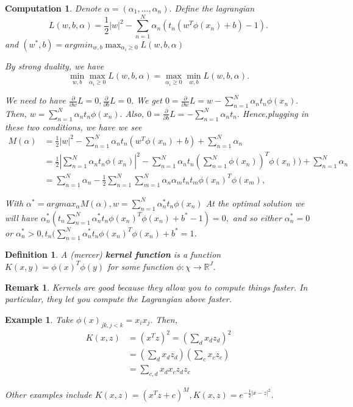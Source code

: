 \documentclass{amsart}
\newtheorem{comp}[subsubsection]{Computation}
\newtheorem{defn}[subsubsection]{Definition}
\newtheorem{rem}[subsubsection]{Remark}
\newtheorem{eg}[subsection]{Example}
\begin{document}
\begin{comp}
Denote $\alpha = (\alpha_1, \ldots, \alpha_n).$ Define the lagrangian 
$$L(w,b,\alpha) = \frac 1 2 |w|^2 - \sum_{n=1}^N \alpha_n(t_n (w^T\phi(x_n)+b)-1).$$ and
$(w^*,b) = argmin_{w,b} \max_{\alpha_i \geq 0} L(w,b,\alpha)$

By strong duality, we have 
$$\min_{w,b} \max_{\alpha_i \geq 0} L(w,b,\alpha) = \max_{\alpha_i \geq 0} \min_{w,b} L(w,b,\alpha).$$

We need to have $\frac \partial {\partial w} L = 0,\frac {\partial}{\partial b} L = 0.$ We get $0=\frac \partial {\partial w} L = w - \sum_{n=1}^N \alpha_n t_n \phi(x_n).$ Then, $w = \sum_{n=1}^N \alpha_n t_n \phi(x_n).$
Also, $0= \frac {\partial}{\partial b} L = - \sum_{n=1}^N \alpha_n t_n.$ Hence,plugging in these two conditions, we have we see 
\begin{align*}
M(\alpha) &= \frac 1 2 |w|^2 - \sum_{n=1}^N \alpha_n t_n(w^T \phi(x_n)+b) + \sum_{n=1}^N \alpha_n 
\\
&= \frac 1 2 |\sum_{n=1}^N \alpha_nt_n \phi(x_n)|^2 - \sum_{n=1}^N \alpha_n t_n(\sum_{n=1}^N \phi(x_n))^T \phi(x_n)) + \sum_{n=1}^N \alpha_n 
\\
&= \sum_{n=1}^N \alpha_n - \frac 1 2 \sum_{n=1}^N \sum_{m=1}^N \alpha_n \alpha_m t_n t_m \phi(x_n)^T \phi(x_m),
\end{align*} 

With $\alpha^* = argmax_{\alpha} M(\alpha),w = \sum_{n=1}^N \alpha_n^* t_n \phi(x_n)$ At the optimal solution we will have $\alpha_n^*(t_n\sum_{n=1}^N\alpha^*_n t_n \phi(x_n)^T\phi(x_n)+b^*-1)=0,$ and so either $\alpha_n^* = 0$ or $\alpha_n^* >0,t_n(\sum_{n=1}^N \alpha^*_n t_n \phi(x_n)^T \phi(x_n) + b^* =  1$.
\end{comp}

\begin{defn}
A (mercer) {\bf kernel function} is a function $K(x,y) = \phi(x)^T\phi(y)$ for some function $\phi:\chi \rightarrow \mathbb R^J.$
\end{defn}

\begin{rem}
Kernels are good because they allow you to compute things faster. In particular, they let you compute the Lagrangian above faster.
\end{rem}

\begin{eg}
Take $\phi(x)_{jk,j< k} =x_ix_j.$ Then, 
\begin{align*}
K(x,z)& = (x^Tz)^2=(\sum_d x_d z_d)^2
\\
&= (\sum_d x_d z_d)(\sum_c x_c z_c)
\\
&= \sum_{c,d} x_d x_c z_d z_c
\end{align*}

Other examples include $K(x,z) = (x^Tz+c)^M, K(x,z) = e^{-\frac 1 2 |x-z|^2}.$
\end{eg}
\end{document}

